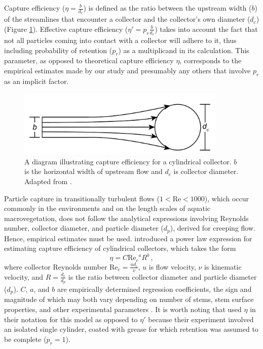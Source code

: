 \documentclass{scrreprt}
\newcommand\Rey{\mathrm{Re}}
\begin{document}
Capture efficiency ($\eta=\frac{b}{d_c}$) is defined as the ratio between the upstream width ($b$) of the streamlines that encounter a collector and the collector's own diameter ($d_c$) (Figure \ref{fig:capeff}). Effective capture efficiency ($\eta\prime=p_r\frac{b}{d_c}$) takes into account the fact that not all particles coming into contact with a collector will adhere to it, thus including probability of retention ($p_r$) as a multiplicand in its calculation. This parameter, as opposed to theoretical capture efficiency $\eta$, corresponds to the empirical estimates made by our study and presumably any others that involve $p_r$ as an implicit factor.

\begin{figure}[htbp]
\includegraphics[width=10cm]{collectorefficiency.png}
\centering
\caption{A diagram illustrating capture efficiency for a cylindrical collector. $b$ is the horizontal width of upstream flow and $d_c$ is collector diameter. Adapted from \cite{Palmer_2004}.}
\label{fig:capeff}
\end{figure}

Particle capture in transitionally turbulent flows ($1<\Rey<1000$), which occur commonly in the environments and on the length scales of aquatic macrovegetation, does not follow the analytical expressions involving Reynolds number, collector diameter, and particle diameter ($d_p$), derived for creeping flow. Hence, empirical estimates must be used. \cite{Palmer_2004} introduced a power law expression for estimating capture efficiency of cylindrical collectors, which takes the form \[\eta=C{\Rey_c}^{a}R^{b}\,,\] where collector Reynolds number $\Rey_c=\frac{ud_c}{\nu}$, $u$ is flow velocity, $\nu$ is kinematic velocity, and $R=\frac{d_c}{d_p}$ is the ratio between collector diameter and particle diameter ($d_p$). $C$, $a$, and $b$ are empirically determined regression coefficients, the sign and magnitude of which may both vary depending on number of stems, stem surface properties, and other experimental parameters \citep[e.g.,][]{Palmer_2004, Fauria_2015}. It is worth noting that \cite{Palmer_2004} used $\eta$ in their notation for this model as opposed to $\eta\prime$ because their experiment involved an isolated single cylinder, coated with grease for which retention was assumed to be complete ($p_r = 1$).
\end{document}
